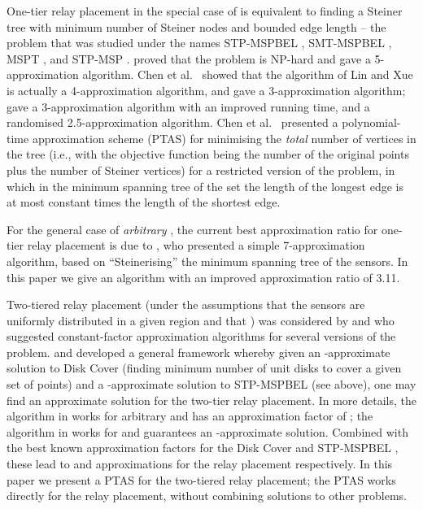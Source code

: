 \documentclass[11pt,a4paper]{article}
\theoremstyle{definition}
\theoremstyle{remark}
\begin{document}
One-tier relay placement in the special case of  \cite{bredin10deploying,cheng08relay} is equivalent to finding a Steiner tree with minimum number of Steiner nodes and bounded edge length -- the problem that was studied under the names STP-MSPBEL \cite{lin99steiner}, SMT-MSPBEL \cite{lloyd07relay,zhang07fault-tolerant}, MSPT \cite{mandoiu00note}, and STP-MSP \cite{chen00approximations,chen01approximations,cheng08relay,liu06optimal,srinivas06mobile}.
\citet{lin99steiner} proved that the problem is NP-hard and gave a 5-approximation algorithm.  Chen et al.\ \cite{chen00approximations,chen01approximations} showed that the algorithm of Lin and Xue is actually a 4-approximation algorithm, and gave a 3-approximation algorithm; \citet{cheng08relay} gave a 3-approximation algorithm with an improved running time, and a randomised 2.5-approximation algorithm.  Chen et al.\ \cite{chen00approximations,chen01approximations} presented a polynomial-time approximation scheme (PTAS) for minimising the \emph{total} number of vertices in the tree (i.e., with the objective function being the number of the original points plus the number of Steiner vertices) for a restricted version of the problem, in which in the minimum spanning tree of the set the length of the longest edge is at most constant times the length of the shortest edge.

For the general case of \emph{arbitrary} , the current best approximation ratio for one-tier relay placement is due to \citet{lloyd07relay}, who presented a simple 7-approximation algorithm, based on ``Steinerising'' the minimum spanning tree of the sensors.  In this paper we give an algorithm with an improved approximation ratio of 3.11.

Two-tiered relay placement (under the assumptions that the sensors are uniformly distributed in a given region and that ) was considered by \citet{hao04fault-tolerant} and \citet{tang06relay} who suggested constant-factor approximation algorithms for several versions of the problem.  \citet[Thm.~4.1]{lloyd07relay} and \citet[Thm.~1]{srinivas06mobile} developed a general framework whereby given an -approximate solution to Disk Cover (finding minimum number of unit disks to cover a given set of points) and a -approximate solution to STP-MSPBEL (see above), one may find an approximate solution for the two-tier relay placement.  In more details, the algorithm in \citet{lloyd07relay} works for arbitrary  and has an approximation factor of ; the algorithm in \citet{srinivas06mobile} works for  and guarantees an -approximate solution.  Combined with the best known approximation factors for the Disk Cover \cite{hochbaum85approximation} and STP-MSPBEL \cite{chen00approximations,chen01approximations,cheng08relay}, these lead to  and  approximations for the relay placement respectively.  In this paper we present a PTAS for the two-tiered relay placement; the PTAS works directly for the relay placement, without combining solutions to other problems.
\end{document}
